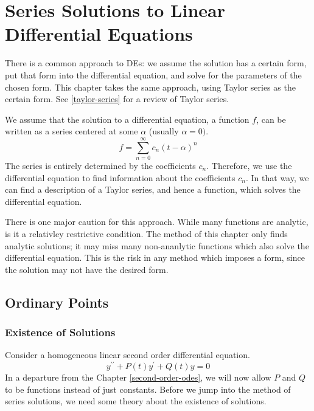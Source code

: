\documentclass[fleqn,letterpaper]{report}
\begin{document}
\chapter{Series Solutions to Linear Differential Equations}
\label{series-solutions}

There is a common approach to DEs:
we assume the solution has a certain form, put
that form into the differential equation, and solve for the
parameters of the chosen form. This chapter takes the same
approach, using Taylor series as the certain form. See
\ref{taylor-series} for a review of Taylor series.

We assume that the solution to a differential equation, a
function $f$, can be written as a series centered at some
$\alpha$ (usually $\alpha = 0)$.
\begin{equation*}
f = \sum_{n=0}^\infty c_n (t-\alpha)^n
\end{equation*}
The series is entirely determined by the coefficients $c_n$.
Therefore, we use the differential equation to find
information about the coefficients $c_n$. In that way, we can
find a description of a Taylor series, and hence a function,
which solves the differential equation.

There is one major caution for this approach.  While many
functions are analytic, is it a relativley restrictive
condition. The method of this chapter only finds analytic
solutions; it may miss many non-ananlytic functions which also
solve the differential equation. This is the risk in any
method which imposes a form, since the solution may not have
the desired form.

\section{Ordinary Points}
\label{ordinary-points}

\subsection{Existence of Solutions}
\label{ordinary-points-existence}

Consider a homogeneous linear second order differential
equation. 
\begin{equation*}
y^{\prime \prime} + P(t) y^\prime + Q(t) y= 0
\end{equation*}
In a departure from the Chapter \ref{second-order-odes}, we will
now allow $P$ and $Q$ to be functions instead of just
constants.  Before we jump into the method of series solutions, 
we need some theory about the existence of solutions. 
\end{document}
